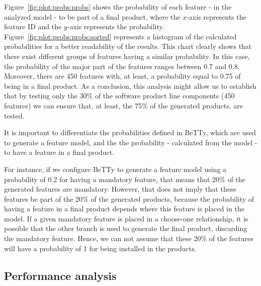 Figure~\ref{fig:plot:probs:probs} shows the probability of each feature - in the analyzed model - to 
be part of a final product, where the $x$-axis
represents the feature ID and the $y$-axis represents the probability.
Figure~\ref{fig:plot:probs:probs:sorted} represents a histogram of the calculated probabilities for a better
readability of the results. This chart clearly shows that there exist
different groups of features having a similar probability. In this case, the probability of the major part 
of the features ranges between 0.7 and 0.8.
%
Moreover, there are 450 features with, at least, a probability equal to 0.75 of being in a final product. As a conclusion, this analysis might allow us to establish that by testing only the 30\% of the software product line components (450 features) we can ensure that, at least, the 75\% of the generated products, are tested.

It is important to differentiate the probabilities defined in BeTTy, which are used to generate a 
feature model, and the the probability - calculated from the model - to have a feature in a final
product. 

For instance, if we configure BeTTy to generate a feature model using a probability
of 0.2 for having a mandatory feature, that means that 20\% of the generated features are mandatory.
However, that does not imply that these features be part of the 20\% of the generated products, because
the probability of having a feature in a final product depends where this feature is placed in the 
model. If a given mandatory feature is placed in a choose-one relationship, it is possible that
the other branch is used to generate the final product, discarding the mandatory feature.
Hence, we can not assume that these 20\% of the features will have a probability of 1 for being 
installed in the products.



\subsection{Performance analysis}
\label{sec:stat:impl:performance:analysis}

